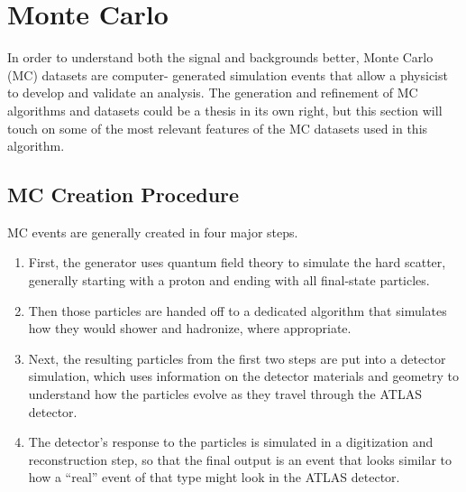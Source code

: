  

\chapter[Monte Carlo]{Monte Carlo}

In order to understand both the signal and backgrounds better, Monte Carlo (MC) datasets are computer-
generated simulation events that allow a physicist to develop and validate an analysis.  The generation and refinement of MC 
algorithms and datasets could be a thesis in its own right, but this section will touch on some of 
the most relevant features of the MC datasets used in this algorithm.


\section{MC Creation Procedure}
\label{sec:mc-gen-overview}
MC events are generally created in four major steps.  
\begin{enumerate}
    \item First, the generator uses quantum field theory to simulate the hard scatter, generally starting with a proton and ending with all final-state particles.  
    \item Then those particles are handed off to a dedicated algorithm that simulates how they would shower and hadronize, where appropriate.  
    \item Next, the resulting particles from the first two steps are put into a detector simulation, which uses information on the detector materials and geometry to understand how the particles evolve as they travel through the ATLAS detector.  
    \item The detector's response to the particles is simulated in a digitization and reconstruction step, so that the final output is an event that looks similar to how a ``real'' event of that type might look in the ATLAS detector. 
\end{enumerate} 

